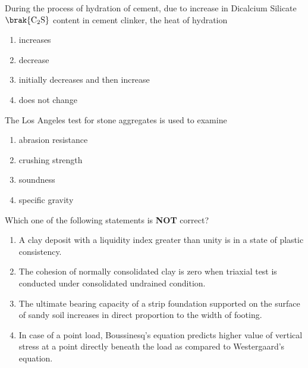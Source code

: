 \item During the process of hydration of cement, due to increase in Dicalcium Silicate $\brak{\text{C}_2\text{S}}$ content in cement clinker, the heat of hydration
\begin{multicols}{2}
    \begin{enumerate}
        \item increases
        \item decrease
        \item initially decreases and then increase
        \item does not change
    \end{enumerate}
\end{multicols}

\item The Los Angeles test for stone aggregates is used to examine
\begin{multicols}{2}
    \begin{enumerate}
        \item abrasion resistance
        \item crushing strength
        \item soundness
        \item specific gravity
    \end{enumerate}
\end{multicols}

\item Which one of the following statements is \textbf{NOT} correct?
\begin{multicols}{2}
    \begin{enumerate}
        \item A clay deposit with a liquidity index greater than unity is in a state of plastic consistency.
        \item The cohesion of normally consolidated clay is zero when triaxial test is conducted under consolidated undrained condition.
        \item The ultimate bearing capacity of a strip foundation supported on the surface of sandy soil increases in direct proportion to the width of footing.
        \item In case of a point load, Boussinesq's equation predicts higher value of vertical stress at a point directly beneath the load as compared to Westergaard's equation.
    \end{enumerate}
\end{multicols}

